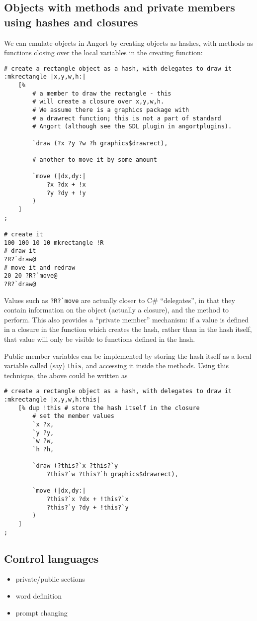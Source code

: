 \subsection{Objects with methods and private members using hashes and closures}
We can emulate objects in Angort by creating objects as
hashes, with methods as functions closing over the local variables
in the creating function:

\begin{lstlisting}
# create a rectangle object as a hash, with delegates to draw it
:mkrectangle |x,y,w,h:|
    [%
        # a member to draw the rectangle - this
        # will create a closure over x,y,w,h.
        # We assume there is a graphics package with
        # a drawrect function; this is not a part of standard
        # Angort (although see the SDL plugin in angortplugins).
        
        `draw (?x ?y ?w ?h graphics$drawrect),
        
        # another to move it by some amount
        
        `move (|dx,dy:| 
            ?x ?dx + !x
            ?y ?dy + !y
        )
    ]
;   

# create it
100 100 10 10 mkrectangle !R
# draw it
?R?`draw@
# move it and redraw
20 20 ?R?`move@
?R?`draw@
\end{lstlisting}
Values such as \verb+?R?`move+ are actually closer to C\# ``delegates'', in that they 
contain information on the object (actually a closure), and the method to perform.
This also provides a ``private member'' mechanism: if a value is defined
in a closure in the function which creates the hash, rather than in
the hash itself, that value will only be visible to functions defined
in the hash.

Public member variables can be implemented by storing the hash
itself as a local variable called (say) \texttt{this}, and accessing it inside
the methods. Using this technique, the above could be written as 
\begin{lstlisting}
# create a rectangle object as a hash, with delegates to draw it
:mkrectangle |x,y,w,h:this|
    [% dup !this # store the hash itself in the closure
        # set the member values
        `x ?x,
        `y ?y,
        `w ?w,
        `h ?h,
        
        `draw (?this?`x ?this?`y 
            ?this?`w ?this?`h graphics$drawrect),
        
        `move (|dx,dy:| 
            ?this?`x ?dx + !this?`x
            ?this?`y ?dy + !this?`y
        )
    ]
;   
\end{lstlisting}





\subsection{Control languages}
{\color{red}
\begin{itemize}
\item private/public sections
\item word definition
\item prompt changing
\end{itemize}
}
